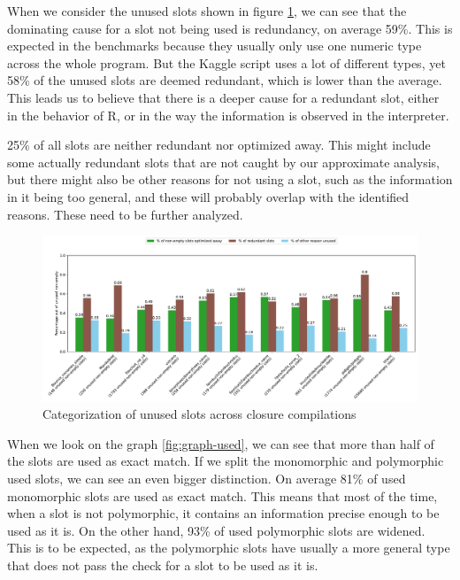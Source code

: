 When we consider the unused slots shown in figure \ref{fig:graph-unused}, we can see that the dominating cause for a slot not being used is redundancy, on average 59\%. This is expected in the benchmarks because they usually only use one numeric type across the whole program. But the Kaggle script uses a lot of different types, yet 58\% of the unused slots are deemed redundant, which is lower than the average. This leads us to believe that there is a deeper cause for a redundant slot, either in the behavior of R, or in the way the information is observed in the interpreter.


25\% of all slots are neither redundant nor optimized away. This might include some actually redundant slots that are not caught by our approximate analysis, but there might also be other reasons for not using a slot, such as the information in it being too general, and these will probably overlap with the identified reasons. These need to be further analyzed.

\begin{figure}
	\centering
	\begin{adjustwidth}{-3cm}{-3cm}
		\includegraphics[width=1.5\textwidth]{figures/unused.pdf}
	\end{adjustwidth}
	\caption{Categorization of unused slots across closure compilations}\label{fig:graph-unused}
\end{figure}

When we look on the graph \ref{fig:graph-used}, we can see that more than half of the slots are used as exact match. If we split the monomorphic and polymorphic used slots, we can see an even bigger distinction. On average 81\% of used monomorphic slots are used as exact match. This means that most of the time, when a slot is not polymorphic, it contains an information precise enough to be used as it is. On the other hand, 93\% of used polymorphic slots are widened. This is to be expected, as the polymorphic slots have usually a more general type that does not pass the check for a slot to be used as it is.

